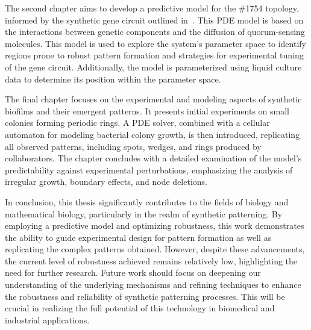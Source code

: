 The second chapter aims to develop a predictive model for the \#1754 topology, informed by the synthetic gene circuit outlined in~\cite{Tica2020}.
This PDE model is based on the interactions between genetic components and the diffusion of quorum-sensing molecules.
This model is used to explore the system's parameter space to identify regions prone to robust pattern formation and strategies for experimental tuning of the gene circuit.
Additionally, the model is parameterized using liquid culture data to determine its position within the parameter space.

The final chapter focuses on the experimental and modeling aspects of synthetic biofilms and their emergent patterns.
It presents initial experiments on small colonies forming periodic rings.
A PDE solver, combined with a cellular automaton for modeling bacterial colony growth, is then introduced, replicating all observed patterns, including spots, wedges, and rings produced by collaborators.
The chapter concludes with a detailed examination of the model's predictability against experimental perturbations, emphasizing the analysis of irregular growth, boundary effects, and node deletions.

In conclusion, this thesis significantly contributes to the fields of biology and mathematical biology, particularly in the realm of synthetic patterning.
By employing a predictive model and optimizing robustness, this work demonstrates the ability to guide experimental design for pattern formation as well as replicating the complex patterns obtained.
However, despite these advancements, the current level of robustness achieved remains relatively low, highlighting the need for further research.
Future work should focus on deepening our understanding of the underlying mechanisms and refining techniques to enhance the robustness and reliability of synthetic patterning processes.
This will be crucial in realizing the full potential of this technology in biomedical and industrial applications.

